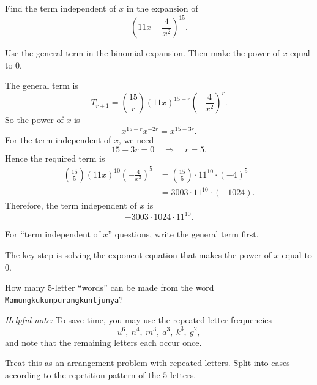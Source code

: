\begin{problem}
Find the term independent of $x$ in the expansion of
\[
\left(11x-\frac{4}{x^2}\right)^{15}.
\]
\end{problem}

\begin{hint}
Use the general term in the binomial expansion. Then make the power of $x$ equal to $0$.
\end{hint}

\begin{solution}
The general term is
\[
T_{r+1}=\binom{15}{r}(11x)^{15-r}\left(-\frac{4}{x^2}\right)^r.
\]
So the power of $x$ is
\[
x^{15-r}x^{-2r}=x^{15-3r}.
\]
For the term independent of $x$, we need
\[
15-3r=0 \quad \Rightarrow \quad r=5.
\]
Hence the required term is
\begin{align*}
\binom{15}{5}(11x)^{10}\left(-\frac{4}{x^2}\right)^5
&= \binom{15}{5}\cdot 11^{10}\cdot (-4)^5 \\
&= 3003 \cdot 11^{10}\cdot (-1024).
\end{align*}
Therefore, the term independent of $x$ is
\[
\boxed{-3003\cdot 1024\cdot 11^{10}}.
\]
\end{solution}

\begin{takeaways}
\item For ``term independent of $x$'' questions, write the general term first.
\item The key step is solving the exponent equation that makes the power of $x$ equal to $0$.
\end{takeaways}

\begin{problem}
How many $5$-letter ``words'' can be made from the word \texttt{Mamungkukumpurangkuntjunya}?

\smallskip
\noindent\textit{Helpful note:} To save time, you may use the repeated-letter frequencies
\[
u^6,\ n^4,\ m^3,\ a^3,\ k^3,\ g^2,
\]
and note that the remaining letters each occur once.
\end{problem}

\begin{hint}
Treat this as an arrangement problem with repeated letters. Split into cases according to the repetition pattern of the $5$ letters.
\end{hint}

